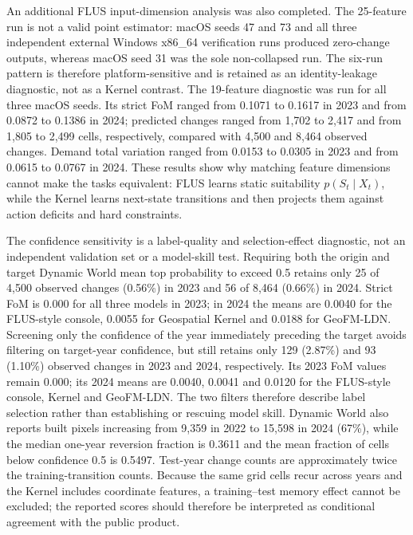\documentclass[
]{article}
\begin{document}
An additional FLUS input-dimension analysis was also completed. The
25-feature run is not a valid point estimator: macOS seeds 47 and 73 and
all three independent external Windows x86\_64 verification runs
produced zero-change outputs, whereas macOS seed 31 was the sole
non-collapsed run. The six-run pattern is therefore platform-sensitive
and is retained as an identity-leakage diagnostic, not as a Kernel
contrast. The 19-feature diagnostic was run for all three macOS seeds.
Its strict FoM ranged from 0.1071 to 0.1617 in 2023 and from 0.0872 to
0.1386 in 2024; predicted changes ranged from 1,702 to 2,417 and from
1,805 to 2,499 cells, respectively, compared with 4,500 and 8,464
observed changes. Demand total variation ranged from 0.0153 to 0.0305 in
2023 and from 0.0615 to 0.0767 in 2024. These results show why matching
feature dimensions cannot make the tasks equivalent: FLUS learns static
suitability \(p(S_t\mid X_t)\), while the Kernel learns next-state
transitions and then projects them against action deficits and hard
constraints.

The confidence sensitivity is a label-quality and selection-effect
diagnostic, not an independent validation set or a model-skill test.
Requiring both the origin and target Dynamic World mean top probability
to exceed 0.5 retains only 25 of 4,500 observed changes (0.56\%) in 2023
and 56 of 8,464 (0.66\%) in 2024. Strict FoM is 0.000 for all three
models in 2023; in 2024 the means are 0.0040 for the FLUS-style console,
0.0055 for Geospatial Kernel and 0.0188 for GeoFM-LDN. Screening only
the confidence of the year immediately preceding the target avoids
filtering on target-year confidence, but still retains only 129 (2.87\%)
and 93 (1.10\%) observed changes in 2023 and 2024, respectively. Its
2023 FoM values remain 0.000; its 2024 means are 0.0040, 0.0041 and
0.0120 for the FLUS-style console, Kernel and GeoFM-LDN. The two filters
therefore describe label selection rather than establishing or rescuing
model skill. Dynamic World also reports built pixels increasing from
9,359 in 2022 to 15,598 in 2024 (67\%), while the median one-year
reversion fraction is 0.3611 and the mean fraction of cells below
confidence 0.5 is 0.5497. Test-year change counts are approximately
twice the training-transition counts. Because the same grid cells recur
across years and the Kernel includes coordinate features, a
training--test memory effect cannot be excluded; the reported scores
should therefore be interpreted as conditional agreement with the public
product.
\end{document}
